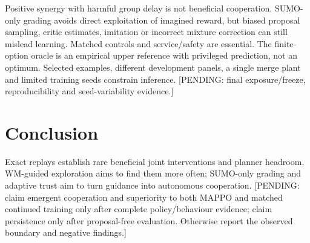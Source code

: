 \documentclass[conference]{IEEEtran}
\newcommand{\pending}[1]{\textcolor{red!80!black}{[PENDING: #1]}}
\begin{document}
Positive synergy with harmful group delay is not beneficial cooperation.
SUMO-only grading avoids direct exploitation of imagined reward, but biased
proposal sampling, critic estimates, imitation or incorrect mixture correction
can still mislead learning. Matched controls and service/safety are essential. The
finite-option oracle is an empirical upper reference with privileged
prediction, not an optimum. Selected examples, different development panels,
a single merge plant and limited training seeds constrain inference.
\pending{final exposure/freeze, reproducibility and seed-variability evidence.}

\section{Conclusion}
Exact replays establish rare beneficial joint interventions and planner
headroom. WM-guided exploration aims to find them more often; SUMO-only
grading and adaptive trust aim to turn guidance into autonomous cooperation.
\pending{claim emergent cooperation and superiority to both MAPPO and
matched continued training only after complete policy/behaviour evidence;
claim persistence only after proposal-free evaluation. Otherwise report the
observed boundary and negative findings.}



\end{document}
